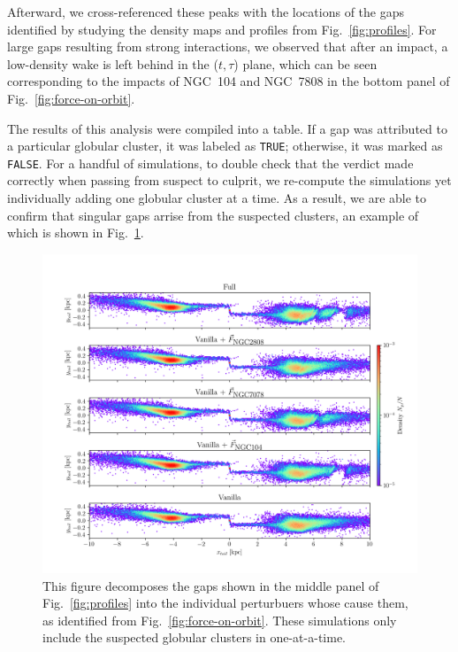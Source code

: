 \documentclass[draft]{aa}
\begin{document}
      Afterward, we cross-referenced these peaks with the locations of the gaps identified by studying the density maps and profiles from Fig.~\ref{fig:profiles}. For large gaps resulting from strong interactions, we observed that after an impact, a low-density wake is left behind in the ($t,\tau$) plane, which can be seen corresponding to the impacts of NGC~104 and NGC~7808 in the bottom panel of Fig.~\ref{fig:force-on-orbit}.

      The results of this analysis were compiled into a table. If a gap was attributed to a particular globular cluster, it was labeled as \texttt{TRUE}; otherwise, it was marked as \texttt{FALSE}. For a handful of simulations, to double check that the verdict made correctly when passing from suspect to culprit, we re-compute the simulations yet individually adding one globular cluster at a time. As a result, we are able to confirm that singular gaps arrise from the suspected clusters, an example of which is shown in Fig.~\ref{fig:decomposition}. 

      \begin{figure}
        \centering
        \includegraphics[width=\linewidth]{decomposition-monte-carlo-009-with-3-gaps.png}
        \caption{This figure decomposes the gaps shown in the middle panel of Fig.~\ref{fig:profiles} into the individual perturbuers whose cause them, as identified from Fig.~\ref{fig:force-on-orbit}. These simulations only include the suspected globular clusters in one-at-a-time.}
        \label{fig:decomposition}
        \end{figure} 
\end{document}
